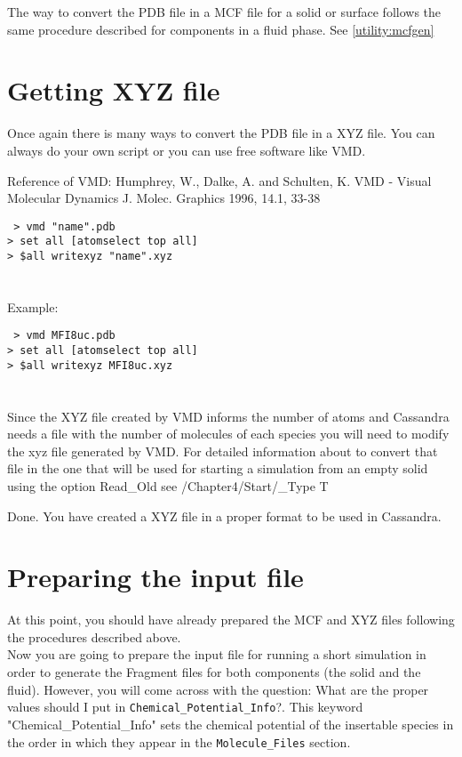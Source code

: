The way to convert the PDB file in a MCF file for a solid or surface 
follows the same procedure described for components in a fluid phase. See \ref{utility:mcfgen}

\section{Getting XYZ file}\label{sec:solid_xyz}

Once again there is many ways to convert the PDB file in a XYZ file. 
You can always do your own script or you can use free software like VMD.

Reference of VMD:
Humphrey, W., Dalke, A. and Schulten, K.
VMD - Visual Molecular Dynamics
J. Molec. Graphics 1996, 14.1, 33-38

\texttt{
> vmd "name".pdb \\
> set all [atomselect top all] \\
> \$all writexyz "name".xyz \\
}
\\ \\

Example:

\texttt{
> vmd MFI8uc.pdb \\
> set all [atomselect top all] \\
> \$all writexyz MFI8uc.xyz \\
}
\\ \\
Since the XYZ file created by VMD informs the number of atoms and Cassandra needs a 
file with the number of molecules of each species you will need to modify the xyz file generated by VMD. 
For detailed information about to convert that file in the one that  will be used for starting a simulation 
from an empty solid using the option Read\_Old see /Chapter4/Start/\_Type  T

Done. You have created a XYZ file in a proper format to be used in Cassandra.

\section{Preparing the input file}

At this point, you should have already prepared the MCF and XYZ files following the procedures described above. \\ 

Now you are going to prepare the input file for running a short simulation in order to generate the 
Fragment files for both components (the solid and the fluid). However, 
you will come across with the question: What are the proper values should 
I put in \texttt{Chemical\_Potential\_Info}?. This keyword "Chemical\_Potential\_Info" sets 
the chemical potential of the insertable species in the order in which they 
appear in the \texttt{Molecule\_Files} section. \\ 

